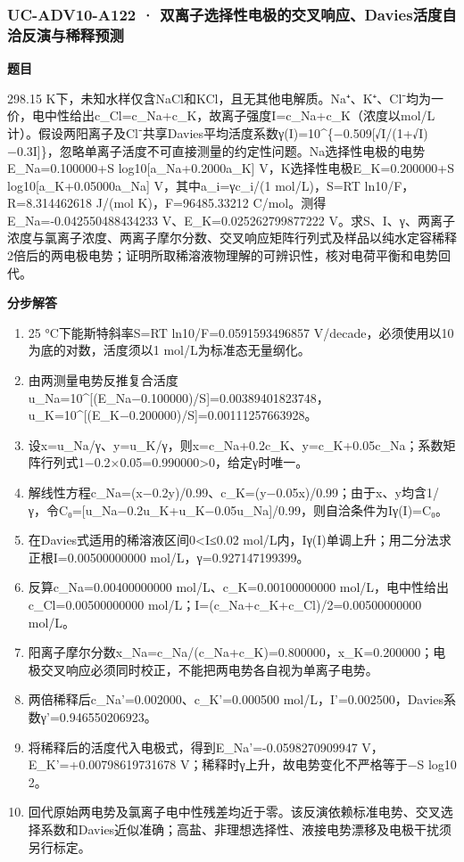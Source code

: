 \documentclass[UTF8,11pt,a4paper]{ctexart}
\begin{document}
\subsubsection*{UC-ADV10-A122 · 双离子选择性电极的交叉响应、Davies活度自洽反演与稀释预测}
\noindent\textbf{题目}\par
298.15 K下，未知水样仅含NaCl和KCl，且无其他电解质。Na⁺、K⁺、Cl⁻均为一价，电中性给出c\_Cl=c\_Na+c\_K，故离子强度I=c\_Na+c\_K（浓度以mol/L计）。假设两阳离子及Cl⁻共享Davies平均活度系数γ(I)=10\textasciicircum{}\{−0.509[√I/(1+√I)−0.3I]\}，忽略单离子活度不可直接测量的约定性问题。Na选择性电极的电势E\_Na=0.100000+S log10[a\_Na+0.2000a\_K] V，K选择性电极E\_K=0.200000+S log10[a\_K+0.05000a\_Na] V，其中a\_i=γc\_i/(1 mol/L)，S=RT ln10/F，R=8.314462618 J/(mol K)，F=96485.33212 C/mol。测得E\_Na=-0.042550488434233 V、E\_K=0.025262799877222 V。求S、I、γ、两离子浓度与氯离子浓度、两离子摩尔分数、交叉响应矩阵行列式及样品以纯水定容稀释2倍后的两电极电势；证明所取稀溶液物理解的可辨识性，核对电荷平衡和电势回代。\par
\medskip\noindent\textbf{分步解答}
\begin{enumerate}
\item 25 °C下能斯特斜率S=RT ln10/F=0.0591593496857 V/decade，必须使用以10为底的对数，活度须以1 mol/L为标准态无量纲化。
\item 由两测量电势反推复合活度u\_Na=10\textasciicircum{}[(E\_Na−0.100000)/S]=0.00389401823748，u\_K=10\textasciicircum{}[(E\_K−0.200000)/S]=0.00111257663928。
\item 设x=u\_Na/γ、y=u\_K/γ，则x=c\_Na+0.2c\_K、y=c\_K+0.05c\_Na；系数矩阵行列式1−0.2×0.05=0.990000>0，给定γ时唯一。
\item 解线性方程c\_Na=(x−0.2y)/0.99、c\_K=(y−0.05x)/0.99；由于x、y均含1/γ，令C₀=[u\_Na−0.2u\_K+u\_K−0.05u\_Na]/0.99，则自洽条件为Iγ(I)=C₀。
\item 在Davies式适用的稀溶液区间0<I≤0.02 mol/L内，Iγ(I)单调上升；用二分法求正根I=0.00500000000 mol/L，γ=0.927147199399。
\item 反算c\_Na=0.00400000000 mol/L、c\_K=0.00100000000 mol/L，电中性给出c\_Cl=0.00500000000 mol/L；I=(c\_Na+c\_K+c\_Cl)/2=0.00500000000 mol/L。
\item 阳离子摩尔分数x\_Na=c\_Na/(c\_Na+c\_K)=0.800000，x\_K=0.200000；电极交叉响应必须同时校正，不能把两电势各自视为单离子电势。
\item 两倍稀释后c\_Na'=0.002000、c\_K'=0.000500 mol/L，I'=0.002500，Davies系数γ'=0.946550206923。
\item 将稀释后的活度代入电极式，得到E\_Na'=-0.0598270909947 V，E\_K'=+0.00798619731678 V；稀释时γ上升，故电势变化不严格等于−S log10 2。
\item 回代原始两电势及氯离子电中性残差均近于零。该反演依赖标准电势、交叉选择系数和Davies近似准确；高盐、非理想选择性、液接电势漂移及电极干扰须另行标定。
\end{enumerate}
\end{document}
